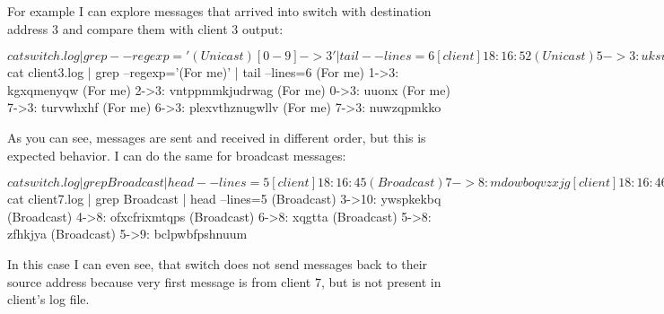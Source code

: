 \documentclass[11pt,a4paper,titlepage]{article}
\begin{document}

For example I can explore messages that arrived into switch with destination address 3 and compare them with client 3 output:
\begin{bashcode}
$ cat switch.log | grep --regexp='(Unicast) [0-9]->3' | tail --lines=6
[client]  18:16:52 (Unicast) 5->3: uksvykjm
[client]  18:16:58 (Unicast) 1->3: kgxqmenyqw
[client]  18:17:03 (Unicast) 2->3: vntppmmkjudrwag
[client]  18:17:05 (Unicast) 0->3: uuonx
[client]  18:17:05 (Unicast) 7->3: turvwhxhf
[client]  18:17:05 (Unicast) 6->3: plexvthznugwllv
$ cat client3.log | grep --regexp='(For me)' | tail --lines=6
(For me) 1->3: kgxqmenyqw
(For me) 2->3: vntppmmkjudrwag
(For me) 0->3: uuonx
(For me) 7->3: turvwhxhf
(For me) 6->3: plexvthznugwllv
(For me) 7->3: nuwzqpmkko
\end{bashcode}
As you can see, messages are sent and received in different order, but this is expected behavior. I can do the same for broadcast messages:
\begin{bashcode}
$ cat switch.log | grep Broadcast | head --lines=5
[client]  18:16:45 (Broadcast) 7->8: mdowboqvzxjg
[client]  18:16:46 (Broadcast) 3->10: ywspkekbq
[client]  18:16:46 (Broadcast) 4->8: ofxcfrixmtqps
[client]  18:16:46 (Broadcast) 6->8: xqgtta
[client]  18:16:46 (Broadcast) 5->8: zfhkjya
$ cat client7.log | grep Broadcast | head --lines=5
(Broadcast) 3->10: ywspkekbq
(Broadcast) 4->8: ofxcfrixmtqps
(Broadcast) 6->8: xqgtta
(Broadcast) 5->8: zfhkjya
(Broadcast) 5->9: bclpwbfpshnuum
\end{bashcode}
In this case I can even see, that switch does not send messages back to their source address because very first message is from client 7, but is not present in client's log file.
\end{document}
